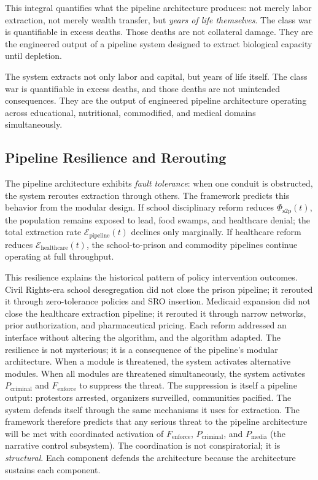 This integral quantifies what the pipeline architecture produces: not merely labor extraction, not merely wealth transfer, but \textit{years of life themselves}. The class war is quantifiable in excess deaths. Those deaths are not collateral damage. They are the engineered output of a pipeline system designed to extract biological capacity until depletion.

\begin{keyinsight}
The system extracts not only labor and capital, but years of life itself. The class war is quantifiable in excess deaths, and those deaths are not unintended consequences. They are the output of engineered pipeline architecture operating across educational, nutritional, commodified, and medical domains simultaneously.
\end{keyinsight}

\subsection{Pipeline Resilience and Rerouting}

The pipeline architecture exhibits \textit{fault tolerance}: when one conduit is obstructed, the system reroutes extraction through others. The framework predicts this behavior from the modular design. If school disciplinary reform reduces $\Phi_{\text{s2p}}(t)$, the population remains exposed to lead, food swamps, and healthcare denial; the total extraction rate $\mathcal{E}_{\text{pipeline}}(t)$ declines only marginally. If healthcare reform reduces $\mathcal{E}_{\text{healthcare}}(t)$, the school-to-prison and commodity pipelines continue operating at full throughput.

This resilience explains the historical pattern of policy intervention outcomes. Civil Rights-era school desegregation did not close the prison pipeline; it rerouted it through zero-tolerance policies and SRO insertion. Medicaid expansion did not close the healthcare extraction pipeline; it rerouted it through narrow networks, prior authorization, and pharmaceutical pricing. Each reform addressed an interface without altering the algorithm, and the algorithm adapted. The resilience is not mysterious; it is a consequence of the pipeline's modular architecture. When a module is threatened, the system activates alternative modules. When all modules are threatened simultaneously, the system activates $P_{\text{criminal}}$ and $F_{\text{enforce}}$ to suppress the threat. The suppression is itself a pipeline output: protestors arrested, organizers surveilled, communities pacified. The system defends itself through the same mechanisms it uses for extraction. The framework therefore predicts that any serious threat to the pipeline architecture will be met with coordinated activation of $F_{\text{enforce}}$, $P_{\text{criminal}}$, and $P_{\text{media}}$ (the narrative control subsystem). The coordination is not conspiratorial; it is \textit{structural}. Each component defends the architecture because the architecture sustains each component.

